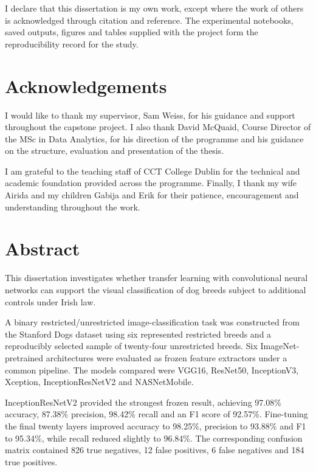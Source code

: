 \documentclass[12pt,a4paper]{report}
\begin{document}
I declare that this dissertation is my own work, except where the
work of others is acknowledged through citation and reference.
The experimental notebooks, saved outputs, figures and tables
supplied with the project form the reproducibility record for
the study.


\chapter*{Acknowledgements}

I would like to thank my supervisor, Sam Weiss, for his guidance
and support throughout the capstone project. I also thank David
McQuaid, Course Director of the MSc in Data Analytics, for his
direction of the programme and his guidance on the structure,
evaluation and presentation of the thesis.

I am grateful to the teaching staff of CCT College Dublin for
the technical and academic foundation provided across the
programme. Finally, I thank my wife Airida and my children
Gabija and Erik for their patience, encouragement and
understanding throughout the work.


\chapter*{Abstract}

This dissertation investigates whether transfer learning with
convolutional neural networks can support the visual
classification of dog breeds subject to additional controls
under Irish law.

A binary restricted/unrestricted image-classification task was
constructed from the Stanford Dogs dataset using six represented
restricted breeds and a reproducibly selected sample of
twenty-four unrestricted breeds. Six ImageNet-pretrained
architectures were evaluated as frozen feature extractors under
a common pipeline. The models compared were VGG16, ResNet50,
InceptionV3, Xception, InceptionResNetV2 and NASNetMobile.

InceptionResNetV2 provided the strongest frozen result, achieving
97.08\% accuracy, 87.38\% precision, 98.42\% recall and an F1
score of 92.57\%. Fine-tuning the final twenty layers improved
accuracy to 98.25\%, precision to 93.88\% and F1 to 95.34\%,
while recall reduced slightly to 96.84\%. The corresponding
confusion matrix contained 826 true negatives, 12 false
positives, 6 false negatives and 184 true positives.
\end{document}
